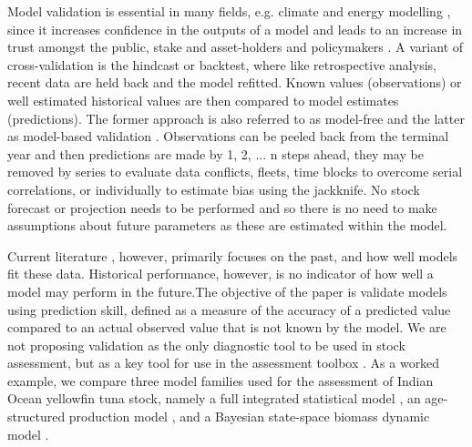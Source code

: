 \documentclass[12pt,halfline,a4paper,nonumbib]{ouparticle}
\begin{document}
  
Model validation is essential in many fields, e.g. climate and energy modelling \parencite{kell2019optimising}, since it increases confidence in the outputs of a model and leads to an increase in trust amongst the public, stake and asset-holders and policymakers \parencite[][]{saltelli2020five}. A variant of cross-validation is the hindcast or backtest, where like retrospective analysis, recent data are held back and the model refitted. Known values (observations) or well estimated historical values are then compared to model estimates (predictions). The former approach is also referred to as model-free and the latter as model-based validation \parencite{kell2016xval}. Observations can be peeled back from the terminal year and then predictions are made by 1, 2, ... n steps ahead, they may be removed by series to evaluate data conflicts, fleets, time blocks to overcome serial correlations, or individually to estimate bias using the jackknife. No stock forecast or projection needs to be performed and so there is no need to make assumptions about future parameters as these are estimated within the model.  

Current literature \parencite[e.g.][]{deroba2014simulation}, however, primarily focuses on the past, and how well models fit these data. Historical performance, however, is no indicator of how well a model may perform in the future.The objective of the paper is validate models using prediction skill, defined as a measure of the accuracy of a predicted value compared to an actual observed value that is not known by the model. We are not proposing validation as the only diagnostic tool to be used in stock assessment, but as a key tool for use in the assessment toolbox \parencite{carvalho2020cookbook}. As a worked example, we compare three model families used for the assessment of Indian Ocean yellowfin tuna stock, namely a full integrated statistical model \parencite[SS,][]{methot2013stock}, an age-structured production model \parencite[ASPM,][]{maunder2015contemporary}, and a Bayesian state-space biomass dynamic model \parencite[JABBA,][]{winker2018jabba}.
\end{document}
